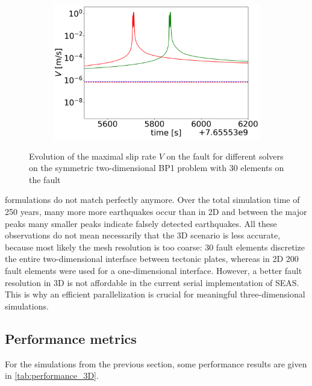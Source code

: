 \begin{figure}[H]
	\begin{subfigure}[b]{0.34\textwidth}
		\centering
		\includegraphics[width=1\textwidth]{images/TANDEMtimeEvolution_3D_maxSlipRate_allFormulations_LastEarthquake_Explicit.png}
	\end{subfigure}
	\caption{Evolution of the maximal slip rate $V$ on the fault for different solvers on the symmetric two-dimensional BP1 problem with 30 elements on the fault}
	\label{fig:timeEvolutionTANDEM_V_3D}
\end{figure}

\noindent formulations do not match perfectly anymore. Over the total simulation time of 250 years, many more more earthquakes occur than in 2D and between the major peaks many smaller peaks indicate falsely detected earthquakes. All these observations do not mean necessarily that the 3D scenario is less accurate, because most likely the mesh resolution is too coarse: 30 fault elements discretize the entire two-dimensional interface between tectonic plates, whereas in 2D 200 fault elements were used for a one-dimensional interface. However, a better fault resolution in 3D is not affordable in the current serial implementation of SEAS. This is why an efficient parallelization is crucial for meaningful three-dimensional simulations.

\subsection{Performance metrics}
For the simulations from the previous section, some performance results are given in \autoref{tab:performance_3D}. 

